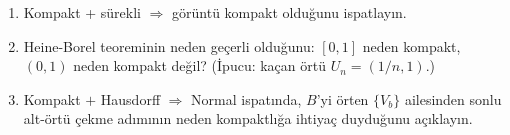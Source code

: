 \begin{enumerate}[label=T\arabic*.]
\item Kompakt + sürekli $\Rightarrow$ görüntü kompakt olduğunu ispatlayın.
\item Heine-Borel teoreminin neden geçerli olduğunu: $[0,1]$ neden kompakt,
      $(0,1)$ neden kompakt değil? (İpucu: kaçan örtü $U_n=(1/n,1)$.)
\item Kompakt $+$ Hausdorff $\Rightarrow$ Normal ispatında, $B$'yi örten
      $\{V_b\}$ ailesinden sonlu alt-örtü çekme adımının neden kompaktlığa
      ihtiyaç duyduğunu açıklayın.
\end{enumerate}
